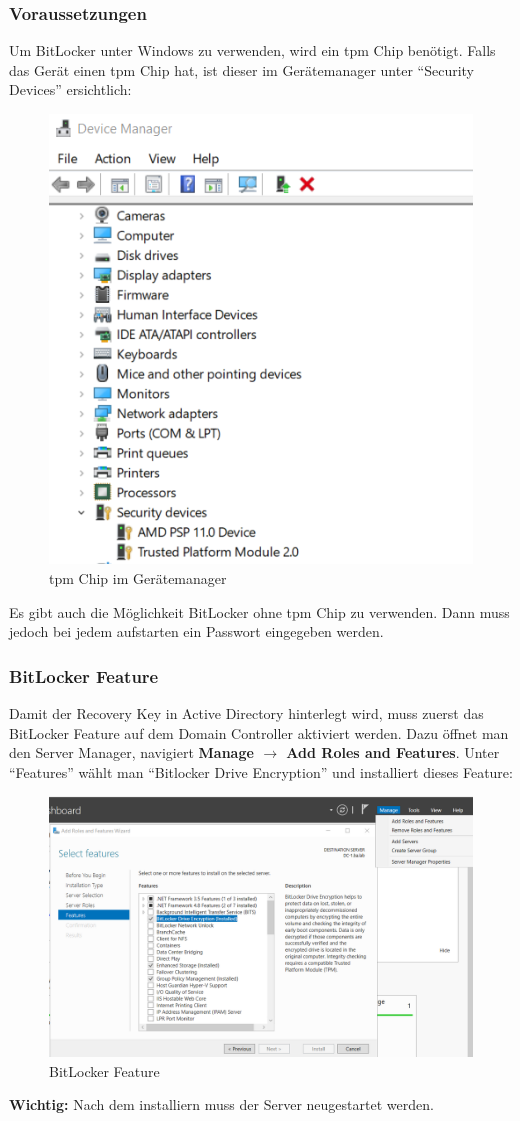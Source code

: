 \subsubsection{Voraussetzungen}
Um BitLocker unter Windows zu verwenden, wird ein \acrfull{tpm} Chip benötigt.
Falls das Gerät einen \acrshort{tpm} Chip hat, ist dieser im Gerätemanager unter ``Security Devices'' ersichtlich:
\begin{figure}[H]
    \centering
    \includegraphics[width=0.6\linewidth]{../img/Encryption/tpm-chip-device-manager.png}
    \caption{\acrshort{tpm} Chip im Gerätemanager}
\end{figure}
Es gibt auch die Möglichkeit BitLocker ohne \acrshort{tpm} Chip zu verwenden. Dann muss jedoch bei jedem aufstarten ein Passwort eingegeben werden.

\subsubsection{BitLocker Feature}
Damit der Recovery Key in Active Directory hinterlegt wird, muss zuerst das BitLocker Feature auf dem Domain Controller aktiviert werden.
Dazu öffnet man den Server Manager, navigiert \textbf{Manage $\rightarrow$ Add Roles and Features}.
Unter ``Features'' wählt man ``Bitlocker Drive Encryption'' und installiert dieses Feature:
\begin{figure}[H]
    \centering
    \includegraphics[width=0.7\linewidth]{../img/Encryption/bitlocker-feature.png}
    \caption{BitLocker Feature}
\end{figure}
\textbf{Wichtig:} Nach dem installiern muss der Server neugestartet werden.

